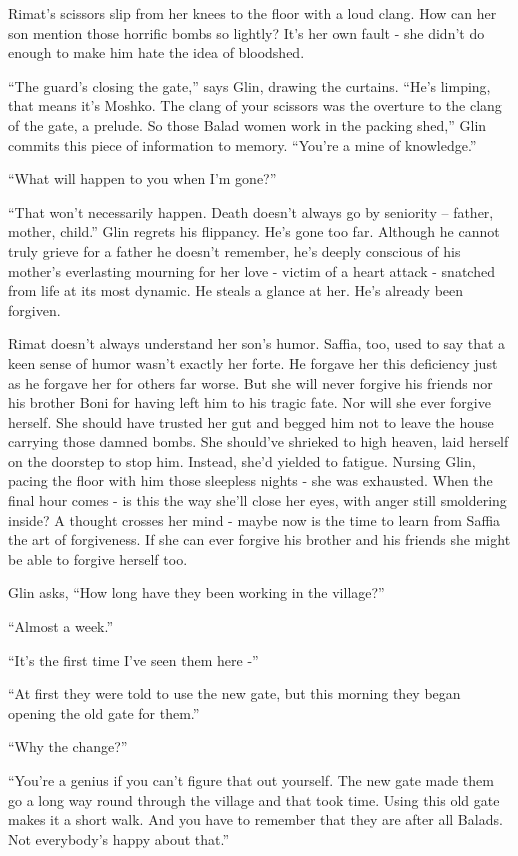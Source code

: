 \documentclass[twoside,11pt]{book}
\begin{document}
Rimat's scissors slip from her knees to the floor with a loud clang. How can her son mention those horrific bombs so
lightly? It's her own fault - she didn't do enough to make him hate the idea of bloodshed.

``The guard's closing the gate,'' says Glin, drawing the curtains. ``He's limping, that means it's Moshko. The clang
of your scissors was the overture to the clang of the gate, a prelude. So those Balad women work in the packing shed,''
Glin commits this piece of information to memory. ``You're a mine of knowledge.''

``What will happen to you when I'm gone?''

``That won't necessarily happen. Death doesn't always go by seniority -- father, mother, child.'' Glin regrets his
flippancy. He's gone too far. Although he cannot truly grieve for a father he doesn't remember, he's deeply conscious
of his mother's everlasting mourning for her love - victim of a heart attack - snatched from life at its most
dynamic. He steals a glance at her. He's already been forgiven.

Rimat doesn't always understand her son's humor. Saffia, too, used to
say that a keen sense of humor wasn't exactly her forte. He forgave
her this deficiency just as he forgave her for others far worse. But
she will never forgive his friends nor his brother Boni for having
left him to his tragic fate.  Nor will she ever forgive herself.  She
should have trusted her gut and begged him not to leave the house
carrying those damned bombs. She should've shrieked to high heaven,
laid herself on the doorstep to stop him. Instead, she'd yielded to
fatigue. Nursing Glin, pacing the floor with him those sleepless
nights - she was exhausted. When the final hour comes - is this the
way she'll close her eyes, with anger still smoldering inside? A
thought crosses her mind - maybe now is the time to learn from Saffia
the art of forgiveness. If she can ever forgive his brother and his
friends she might be able to forgive herself too.

Glin asks, ``How long have they been working in the village?''

``Almost a week.''

``It's the first time I've seen them here -''

``At first they were told to use the new gate, but this morning they
began opening the old gate for them.''

``Why
the change?''

``You're a genius if you can't figure that out yourself. The new gate made them go a long way round
through the village and that took time. Using this old gate makes it a short walk. And you have to remember that
they are after all Balads. Not everybody's happy about that.''
\end{document}
